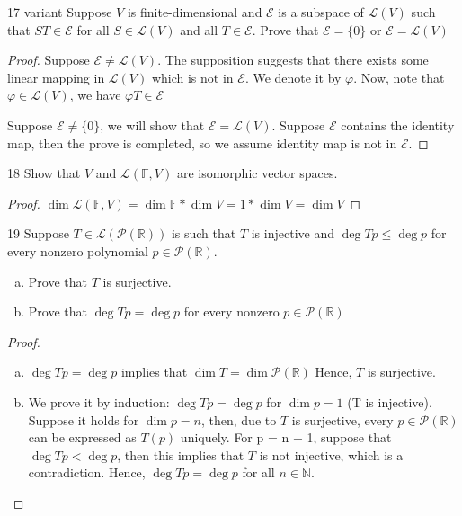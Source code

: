 \documentclass{article}
\newenvironment{problem}[1]{\begin{prob*}{#1}{}}{\end{prob*}}
\newcommand{\Hom}{\mathcal{L}}
\begin{document}
\begin{problem}{17 variant}
Suppose $V$ is finite-dimensional and $\mathcal{E}$ is a subspace of $\mathcal{L}(V)$ such that $ST \in \mathcal{E}$ for all $S \in \mathcal{L}(V)$ and all $T \in \mathcal{E}$. Prove that $\mathcal{E} = \{0\}$ or $\mathcal{E} = \mathcal{L}(V)$
\end{problem}
\begin{proof}
	Suppose $\mathcal{E} \neq \mathcal{L}(V)$. The supposition suggests that there exists some linear mapping in $\mathcal{L}(V)$ which is not in $\mathcal{E}$. We denote it by $\varphi$. Now, note that $\varphi \in \Hom(V)$, we have $\varphi T \in \mathcal{E}$
	\par
	Suppose $\mathcal{E} \neq \{0\}$, we will show that $\mathcal{E} = \mathcal{L}(V).$ Suppose $\mathcal{E}$ contains the identity map, then the prove is completed, so we assume identity map is not in $\mathcal{E}$.
\end{proof}

\begin{problem}{18}
Show that $V$ and $\mathcal{L}(\mathbb{F}, V)$ are isomorphic vector spaces.
\end{problem}
\begin{proof}
	$\operatorname{dim} \mathcal{L}(\mathbb{F}, V) = \operatorname{dim} \mathbb{F} * \operatorname{dim}V = 1 * \operatorname{dim} V = \operatorname{dim} V$
\end{proof}

\newpage

\begin{problem}{19}
Suppose $T \in \mathcal{L}(\mathcal{P}(\mathbb{R}))$ is such that $T$ is injective and $\operatorname{deg} Tp \le \operatorname{deg} p$ for every nonzero polynomial $p \in \mathcal{P}(\mathbb{R})$.
\begin{enumerate}[(a)]
	\item Prove that $T$ is surjective.
	\item Prove that $\operatorname{deg}Tp = \operatorname{deg}p$ for every nonzero $p \in \mathcal{P}(\mathbb{R})$
\end{enumerate}
\end{problem}
\begin{proof}
	\begin{enumerate}[(a)]
		\item $\operatorname{deg}Tp = \operatorname{deg}p$ implies that $\operatorname{dim} T = \operatorname{dim} \mathcal{P}(\mathbb{R})$
		      Hence, $T$ is surjective.
		\item We prove it by induction: $\operatorname{deg}Tp = \operatorname{deg}p$ for $\operatorname{dim}p = 1$ (T is injective). Suppose it holds for $\operatorname{dim} p = n$, then, due to $T$ is surjective, every  $p \in \mathcal{P}(\mathbb{R})$ can be expressed as $T(p)$ uniquely. For p = n + 1, suppose that $\operatorname{deg}Tp < \operatorname{deg}p$, then this implies that $T$ is not injective, which is a contradiction. Hence, $\operatorname{deg}Tp = \operatorname{deg}p$ for all $n \in \mathbb{N}$.
	\end{enumerate}
\end{proof}
\end{document}
